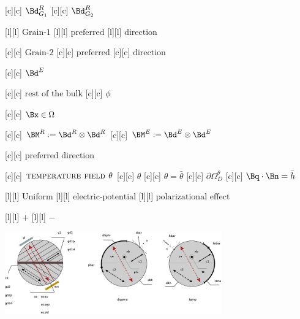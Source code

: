 [c][c] {$\Bd^{R}_{G_1}$}
[c][c] {$\Bd^{R}_{G_2}$}

[l][l] {$\text{Grain-1}$}
[l][l] {$\text{preferred}$}
[l][l] {$\text{direction}$}

[c][c] {$\text{Grain-2}$}
[c][c] {$\text{preferred}$}
[c][c] {$\text{direction}$}

[c][c] {$\Bd^{E}$}

[c][c] {$\text{rest of the bulk}$}
[c][c] {$\phi$}

[c][c] {$\Bx \in \Omega$}

[c][c] {$\BM^{R} := \Bd^{R} \otimes \Bd^{R}$}
[c][c] {$\BM^{E} := \Bd^{E} \otimes \Bd^{E}$}

[c][c] {$\text{preferred direction}$}

[c][c] {$\textsc{temperature field } \theta$}
[c][c] {$\theta$}
[c][c] {$\theta = \bar{\theta}$}
[c][c] {$\partial\Omega^{\theta}_{D}$}
[c][c] {$\Bq\cdot\Bn = \bar{h}$}

[l][l] {$\text{Uniform}$}
[l][l] {$\text{electric-potential}$}
[l][l] {$\text{polarizational effect}$}

[l][l] {$+$}
[l][l] {$-$}

\includegraphics[width=0.7\textwidth]{structuraltwofields.eps}
